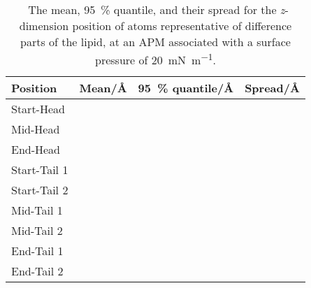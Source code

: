 \begin{table}
\centering
\small
  \caption{\ The mean, \SI{95}{\percent} quantile, and their spread for the \emph{z}-dimension position of atoms representative of difference parts of the lipid, at an APM associated with a surface pressure of \SI{20}{\milli\newton\per\meter}.}
  \label{tab:spread}
  \begin{tabular}{llll}
    \hline
    Position & Mean/\si{\angstrom} & \SI{95}{\percent} quantile/\si{\angstrom} & Spread/\si{\angstrom} \\
    \hline
    Start-Head &  &  &  \\
    Mid-Head &  &  &  \\
    End-Head &  &  &  \\
    \hline
    Start-Tail 1 &  &  &  \\
    Start-Tail 2 &  &  &  \\
    Mid-Tail 1 &  &  &  \\
    Mid-Tail 2 &  &  &  \\
    End-Tail 1 &  &  &  \\
    End-Tail 2 &  &  &  \\
    \hline
  \end{tabular}
\end{table}

